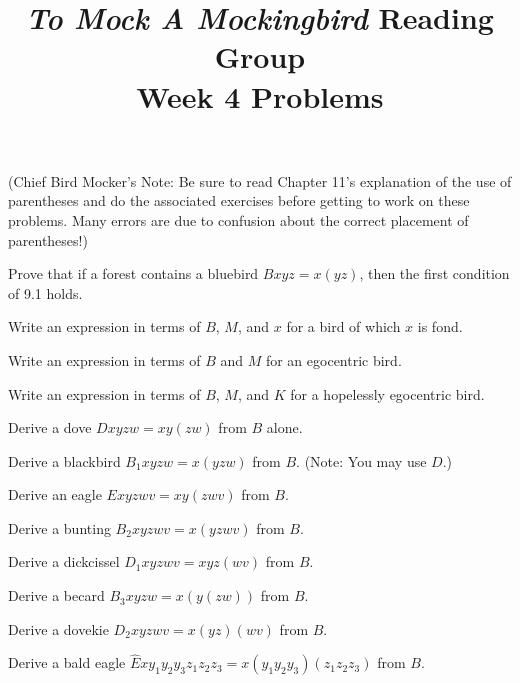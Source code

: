 \documentclass[12pt, letterpaper]{article}
\title{\emph{To Mock A Mockingbird} Reading Group\\Week 4 Problems}
\begin{document}
\maketitle

\disclaimer

\noindent (Chief Bird Mocker's Note: Be sure to read Chapter 11's explanation of the use of parentheses and do the associated exercises before getting to work on these problems. Many errors are due to confusion about the correct placement of parentheses!)

\begin{prob}{11.1}
Prove that if a forest contains a bluebird $Bxyz = x(yz)$, then the first condition of 9.1 holds.
\end{prob}

\begin{prob}{11.2}
Write an expression in terms of $B$, $M$, and $x$ for a bird of which $x$ is fond.
\end{prob}

\begin{prob}{11.3}
Write an expression in terms of $B$ and $M$ for an egocentric bird.
\end{prob}

\begin{prob}{11.4}
Write an expression in terms of $B$, $M$, and $K$ for a hopelessly egocentric bird.
\end{prob}

\begin{prob}{11.5}
Derive a dove $Dxyzw = xy(zw)$ from $B$ alone.
\end{prob}

\begin{prob}{11.6}
Derive a blackbird $B_1xyzw = x(yzw)$ from $B$. (Note: You may use $D$.)
\end{prob}

\begin{prob}{11.7}
Derive an eagle $Exyzwv = xy(zwv)$ from $B$.
\end{prob}

\begin{prob}{11.8}
Derive a bunting $B_2xyzwv = x(yzwv)$ from $B$.
\end{prob}

\begin{prob}{11.9}
Derive a dickcissel $D_1xyzwv = xyz(wv)$ from $B$.
\end{prob}

\begin{prob}{11.10}
Derive a becard $B_3xyzw = x(y(zw))$ from $B$.
\end{prob}

\begin{prob}{11.11}
Derive a dovekie $D_2xyzwv = x(yz)(wv)$ from $B$.
\end{prob}

\begin{prob}{11.12}
Derive a bald eagle $\hat{E}xy_1y_2y_3z_1z_2z_3 = x(y_1y_2y_3)(z_1z_2z_3)$ from  $B$.
\end{prob}
\end{document}
